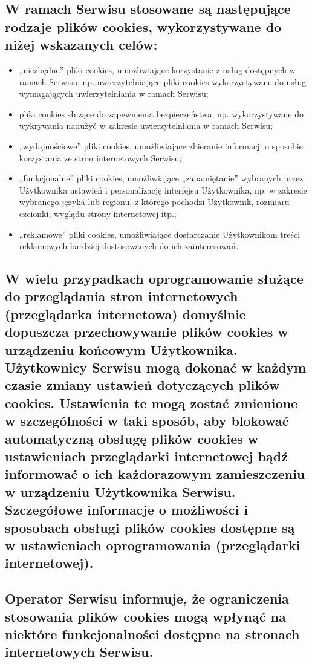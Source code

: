 \subsection{W ramach Serwisu stosowane są następujące rodzaje plików cookies, wykorzystywane do niżej wskazanych celów:}
	\begin{itemize}
		\item „niezbędne” pliki cookies, umożliwiające korzystanie z usług dostępnych w ramach Serwisu, np. uwierzytelniające pliki cookies wykorzystywane do usług wymagających uwierzytelniania w ramach Serwisu;

		\item pliki cookies służące do zapewnienia bezpieczeństwa, np. wykorzystywane do wykrywania nadużyć w zakresie uwierzytelniania w ramach Serwisu;

		\item „wydajnościowe” pliki cookies, umożliwiające zbieranie informacji o sposobie korzystania ze stron internetowych Serwisu;

		\item „funkcjonalne” pliki cookies, umożliwiające „zapamiętanie” wybranych przez Użytkownika ustawień i personalizację interfejsu Użytkownika, np. w zakresie wybranego języka lub regionu, z którego pochodzi Użytkownik, rozmiaru czcionki, wyglądu strony internetowej itp.;
		
		\item „reklamowe” pliki cookies, umożliwiające dostarczanie Użytkownikom treści reklamowych bardziej dostosowanych do ich zainteresowań.
	\end{itemize}

\subsection{W wielu przypadkach oprogramowanie służące do przeglądania stron internetowych (przeglądarka internetowa) domyślnie dopuszcza przechowywanie plików cookies w urządzeniu końcowym Użytkownika. Użytkownicy Serwisu mogą dokonać w każdym czasie zmiany ustawień dotyczących plików cookies. Ustawienia te mogą zostać zmienione w szczególności w taki sposób, aby blokować automatyczną obsługę plików cookies w ustawieniach przeglądarki internetowej bądź informować o ich każdorazowym zamieszczeniu w urządzeniu Użytkownika Serwisu. Szczegółowe informacje o możliwości i sposobach obsługi plików cookies dostępne są w ustawieniach oprogramowania (przeglądarki internetowej).}

\subsection{Operator Serwisu informuje, że ograniczenia stosowania plików cookies mogą wpłynąć na niektóre funkcjonalności dostępne na stronach internetowych Serwisu.}

